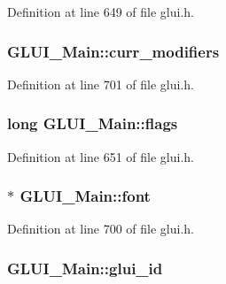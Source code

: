 Definition at line 649 of file glui.\+h.

\hypertarget{class_g_l_u_i___main_a96ca3271c5e6a33bd340bd90aa010b14}{
\subsubsection[{curr\+\_\+modifiers}]{ G\+L\+U\+I\+\_\+\+Main\+::curr\+\_\+modifiers}}\label{class_g_l_u_i___main_a96ca3271c5e6a33bd340bd90aa010b14}


Definition at line 701 of file glui.\+h.

\hypertarget{class_g_l_u_i___main_ac3fbf169a16afe8e09cebf714f4aee65}{
\subsubsection[{flags}]{\setlength{\rightskip}{0pt plus 5cm}long G\+L\+U\+I\+\_\+\+Main\+::flags\hspace{0.3cm}{\ttfamily [protected]}}}\label{class_g_l_u_i___main_ac3fbf169a16afe8e09cebf714f4aee65}


Definition at line 651 of file glui.\+h.

\hypertarget{class_g_l_u_i___main_a349e75284a3c1d4e5e8d1f2903d65f8b}{
\subsubsection[{font}]{$\ast$ G\+L\+U\+I\+\_\+\+Main\+::font}}\label{class_g_l_u_i___main_a349e75284a3c1d4e5e8d1f2903d65f8b}


Definition at line 700 of file glui.\+h.

\hypertarget{class_g_l_u_i___main_a6f8d24f29be85514e1abe05f4f33eb17}{
\subsubsection[{glui\+\_\+id}]{ G\+L\+U\+I\+\_\+\+Main\+::glui\+\_\+id\hspace{0.3cm}{\ttfamily [protected]}}}\label{class_g_l_u_i___main_a6f8d24f29be85514e1abe05f4f33eb17}


